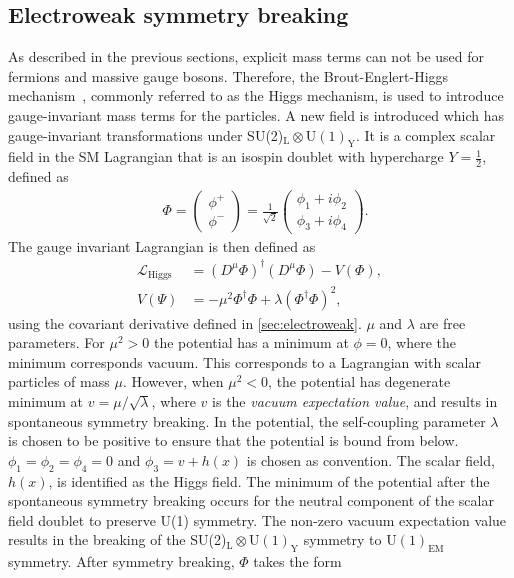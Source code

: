 \subsection{Electroweak symmetry breaking}\label{sec:symmbreak}
As described in the previous sections, explicit mass terms can not be used for fermions and massive gauge bosons. Therefore, the Brout-Englert-Higgs mechanism~\cite{Higgs1964,Englert1964}, commonly referred to as the Higgs mechanism, is used to introduce gauge-invariant mass terms for the particles. A new field is introduced which has gauge-invariant transformations under SU(2)$_\mathrm{L}\otimes\mathrm{U(1)}_\mathrm{Y}$. It is a complex scalar field in the SM Lagrangian that is an isospin doublet with hypercharge $Y = \frac{1}{2}$, defined as
\begin{equation}\renewcommand*{\arraystretch}{\newarraystrech}
    \label{eq:scalarfield}
    \begin{aligned}
        & \Phi = 
        \begin{pmatrix}
            \phi^+ \\
            \phi^- 
        \end{pmatrix} =
        \frac{1}{\sqrt{2}} 
        \begin{pmatrix}
            \phi_1 + i\phi_2 \\
            \phi_3 + i\phi_4
        \end{pmatrix}.
     \end{aligned}
\end{equation}
The gauge invariant Lagrangian is then defined as
\begin{equation}
    \label{eq:lagrangianhiggs}
    \begin{aligned}
        \mathcal{L}_\mathrm{Higgs} &= (D^\mu\Phi)^\dagger(D^\mu\Phi) - V(\Phi), \\
        V(\Psi) &= - \mu^2\Phi^\dagger\Phi + \lambda(\Phi^\dagger\Phi)^2,
     \end{aligned}
\end{equation}
using the covariant derivative defined in \cref{sec:electroweak}. $\mu$ and $\lambda$ are free parameters. For $\mu^2 > 0$ the potential has a minimum at $\phi = 0$, where the minimum corresponds vacuum. This corresponds to a Lagrangian with scalar particles of mass $\mu$. However, when $\mu^2 < 0$, the potential has degenerate minimum at $v = \mu/\sqrt{\lambda}$, where $v$ is the \emph{vacuum expectation value}, and results in spontaneous symmetry breaking. In the potential, the self-coupling parameter $\lambda$ is chosen to be positive to ensure that the potential is bound from below. $\phi_1 = \phi_2 = \phi_4 = 0$ and $\phi_3 = v + h(x)$ is chosen as convention. The scalar field, $h(x)$, is identified as the Higgs field. The minimum of the potential after the spontaneous symmetry breaking occurs for the neutral component of the scalar field doublet to preserve U(1) symmetry. The non-zero vacuum expectation value results in the breaking of the SU(2)$_\mathrm{L}\otimes\mathrm{U(1)}_\mathrm{Y}$ symmetry to $\mathrm{U(1)}_\mathrm{EM}$ symmetry. After symmetry breaking, $\Phi$ takes the form 
